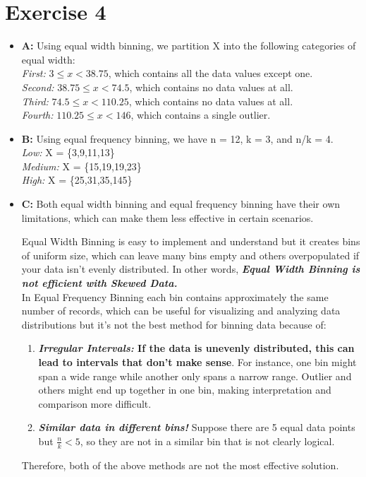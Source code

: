 \documentclass[12pt]{article}
\begin{document}
	\section{Exercise 4}
		\begin{itemize}
			\item \textbf{A:} Using equal width binning, we partition X into the following categories of equal width:\\
				\emph{First:} $3 \leq x < 38.75$, which contains all the data values except one.\\
				\emph{Second:} $38.75 \leq x < 74.5$, which contains no data values at all.\\
				\emph{Third:} $74.5 \leq x < 110.25$, which contains no data values at all.\\
				\emph{Fourth:} $110.25 \leq x < 146$, which contains a single outlier.\\
			
			\item \textbf{B:} Using equal frequency binning, we have n = 12, k = 3, and n/k = 4. \\
				\emph{Low:} X = \{3,9,11,13\}\\
				\emph{Medium:} X = \{15,19,19,23\}\\
				\emph{High:} X = \{25,31,35,145\}
			
			\item \textbf{C:} Both equal width binning and equal frequency binning have their own limitations, which can make them less effective in certain scenarios.
			
				Equal Width Binning is easy to implement and understand but it creates bins of uniform size, which can leave many bins empty and others overpopulated if your data isn't evenly distributed. In other words, \textbf{\emph{Equal Width Binning is not efficient with Skewed Data.}}\\
				
				In Equal Frequency Binning each bin contains approximately the same number of records, which can be useful for visualizing and analyzing data distributions but it's not the best method for binning data because of:
				
				\begin{enumerate}
					\item \textbf{\emph{Irregular Intervals:} If the data is unevenly distributed, this can lead to intervals that don't make sense}. For instance, one bin might span a wide range while another only spans a narrow range. Outlier and others might end up together in one bin, making interpretation and comparison more difficult.
	
					\item \textbf{\emph{Similar data in different bins!}} Suppose there are 5 equal data points but $ \frac{n}{k}<5 $, so they are not in a similar bin that is not clearly logical.
				\end{enumerate}

				
				Therefore, both of the above methods are not the most effective solution.
		\end{itemize}	
\end{document}
